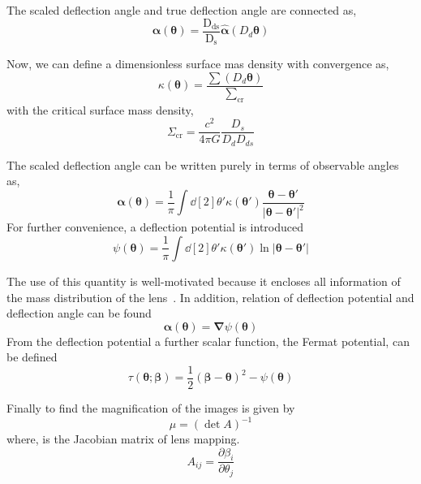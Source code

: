 The scaled deflection angle and true deflection angle are connected as,
\begin{equation}
\pmb\alpha(\pmb\theta)=\frac{\text{D}_{\text{ds}}}{\text{D}_{\text{s}}} \hat{\pmb\alpha}(D_{d}\pmb\theta)
\end{equation}

Now, we can define a dimensionless surface mas density with convergence as,
\begin{equation}
\kappa(\pmb\theta)=\frac{\sum(D_{d} \pmb \theta)}{\sum_\text{cr}}
\label{Equ:KTheta}
\end{equation}
with the critical surface mass density,
\begin{equation}
\Sigma_\text{cr}=\frac{c^2}{4\pi G}\frac{D_{s}}{D_{d}D_{ds}}
\label{SumCr}
\end{equation}

The scaled deflection angle can be written purely in terms of observable angles as,
\begin{equation}
\pmb\alpha(\pmb\theta)=\frac{1}{\pi}\int \dd[2]{\theta'} \kappa(\pmb{\theta}')\frac{\pmb\theta-\pmb\theta'}{| \pmb\theta -\pmb\theta'| ^2}
\label{ScaledDA}
\end{equation} 
For further convenience, a deflection potential is introduced
\begin{equation}
\psi(\pmb\theta)=\frac{1}{\pi}\int \dd[2]{\theta'} \kappa(\pmb\theta') \ln | \pmb\theta- \pmb\theta'| 
\label{psiTheta}
\end{equation}

The use of this quantity is well-motivated because it encloses all information of the mass distribution of the lens~\cite{manual}. In addition, relation of deflection potential and deflection angle can be found
\begin{equation}
\pmb\alpha(\pmb\theta)=\pmb\nabla\psi(\pmb\theta)
\label{Equ:AlphaTheta}
\end{equation}
From the deflection potential a further scalar function, the Fermat potential, can be defined
\begin{equation}
\tau(\pmb\theta; \pmb\beta)=\frac{1}{2}(\pmb\beta -\pmb\theta)^2 -\psi(\pmb\theta)
\label{Equ:Format}
\end{equation}

Finally to find the magnification of the images is given by
\begin{equation}
\mu =(\det A)^{-1}
\label{math:mag}
\end{equation}
where,  is the Jacobian matrix of lens mapping.
\begin{equation}
A_{ij}=\frac{\partial\beta_{i}}{\partial \theta_{j}}
\end{equation}\\


